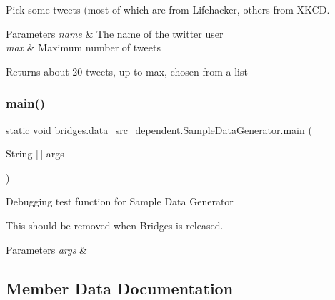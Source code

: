 Pick some tweets (most of which are from Lifehacker, others from X\+K\+CD. 
\begin{DoxyParams}{Parameters}
{\em name} & The name of the twitter user \\
\hline
{\em max} & Maximum number of tweets \\
\hline
\end{DoxyParams}
\begin{DoxyReturn}{Returns}
about 20 tweets, up to max, chosen from a list 
\end{DoxyReturn}
\mbox{\label{classbridges_1_1data__src__dependent_1_1_sample_data_generator_ae37dc24f262b58481822cf228bd97054}} 
\subsubsection{\texorpdfstring{main()}{main()}}
{\footnotesize\ttfamily static void bridges.\+data\+\_\+src\+\_\+dependent.\+Sample\+Data\+Generator.\+main (\begin{DoxyParamCaption}\item[{String \mbox{[}$\,$\mbox{]}}]{args }\end{DoxyParamCaption})\hspace{0.3cm}{\ttfamily [static]}}

Debugging test function for Sample Data Generator

This should be removed when Bridges is released. 
\begin{DoxyParams}{Parameters}
{\em args} & \\
\hline
\end{DoxyParams}


\subsection{Member Data Documentation}
\mbox{\label{classbridges_1_1data__src__dependent_1_1_sample_data_generator_aac86cadaeb8859e94b6ed47a066cbbfc}} 
